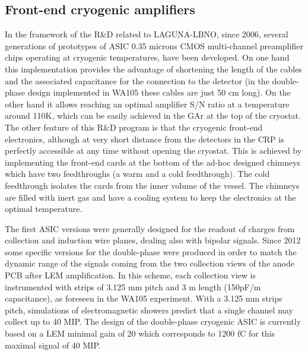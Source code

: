 \subsection{Front-end cryogenic amplifiers}
In the framework of the R\&D related to LAGUNA-LBNO, since 2006, several generations of prototypes of ASIC 0.35 microns CMOS multi-channel preamplifier chips operating at cryogenic temperatures, have been developed. On one hand this implementation provides the advantage of shortening the length of the cables and the associated capacitance for the connection to the detector (in the double-phase design implemented in WA105 these cables are just 50 cm long). On the other hand it allows reaching an optimal amplifier S/N ratio at a temperature around 110K, which can be easily achieved in the GAr at the top of the cryostat. The other feature of this R\&D program is that the cryogenic front-end electronics, although at very short distance from the detectors in the CRP  is perfectly accessible at any time without opening the cryostat. This is achieved by implementing the front-end cards at the bottom of the ad-hoc designed chimneys which have two feedthroughs (a warm and a cold feedthrough). The cold feedthrough isolates the cards from the inner volume of the vessel. The chimneys are filled with inert gas and have a cooling system to keep the electronics at the optimal temperature.

The first ASIC versions were generally designed for the readout of charges from collection and induction wire planes, dealing also with bipolar signals. Since 2012 some specific versions for the double-phase were produced in order to match the dynamic range of the signals coming from the two collection views of the anode PCB after LEM amplification. In this scheme, each collection view is instrumented with strips of 3.125 mm pitch and 3 m length (150pF/m capacitance), as foreseen in the WA105 experiment. With a 3.125 mm strips pitch, simulations of electromagnetic showers predict that a single channel may collect up to 40 MIP. The design of the double-phase cryogenic ASIC is currently based on a LEM minimal gain of 20 which corresponds to 1200 fC for this maximal signal of 40 MIP.  

